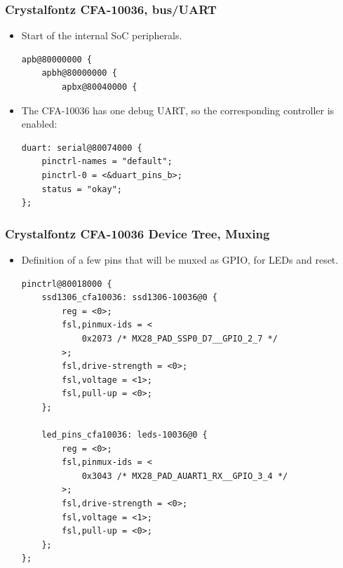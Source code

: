 \begin{frame}[fragile]
  \frametitle{Crystalfontz CFA-10036, bus/UART}
  \begin{itemize}
  \item Start of the internal SoC peripherals.
    \begin{block}{}
    \begin{verbatim}
apb@80000000 {
    apbh@80000000 {
        apbx@80040000 {
\end{verbatim}
\end{block}
\item The CFA-10036 has one debug UART, so the corresponding
  controller is enabled:
  \begin{block}{}
    \begin{verbatim}
duart: serial@80074000 {
    pinctrl-names = "default";
    pinctrl-0 = <&duart_pins_b>;
    status = "okay";
};
    \end{verbatim}
  \end{block}
\end{itemize}
\end{frame}

\begin{frame}[fragile]
  \frametitle{Crystalfontz CFA-10036 Device Tree, Muxing}
\begin{itemize}
  \item Definition of a few pins that will be muxed as GPIO, for LEDs and reset.
  \begin{block}{}
    \begin{verbatim}
pinctrl@80018000 {
    ssd1306_cfa10036: ssd1306-10036@0 {
        reg = <0>;
        fsl,pinmux-ids = <
            0x2073 /* MX28_PAD_SSP0_D7__GPIO_2_7 */
        >;
        fsl,drive-strength = <0>;
        fsl,voltage = <1>;
        fsl,pull-up = <0>;
    };

    led_pins_cfa10036: leds-10036@0 {
        reg = <0>;
        fsl,pinmux-ids = <
            0x3043 /* MX28_PAD_AUART1_RX__GPIO_3_4 */
        >;
        fsl,drive-strength = <0>;
        fsl,voltage = <1>;
        fsl,pull-up = <0>;
    };
};
    \end{verbatim}
  \end{block}
  \end{itemize}
\end{frame}

